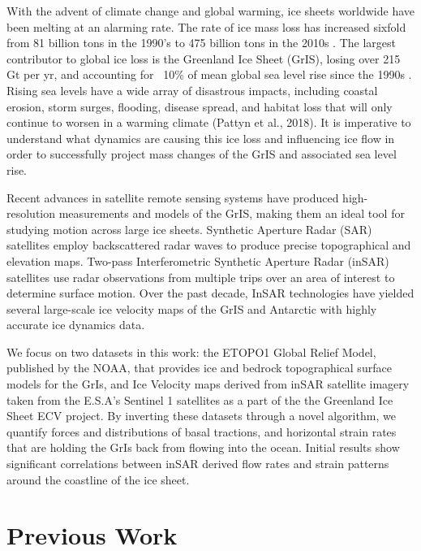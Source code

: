 \documentclass{article}
\begin{document}
With the advent of climate change and global warming, ice sheets worldwide have been melting at an alarming rate. The rate of ice mass loss has increased sixfold from 81 billion tons in the 1990’s to 475 billion tons in the 2010s \cite{stocker_climate_2013}. The largest contributor to global ice loss is the Greenland Ice Sheet (GrIS), losing over 215 Gt per yr, and accounting for ~10\% of mean global sea level rise since the 1990s \cite{stocker_climate_2013}. Rising sea levels have a wide array of disastrous impacts, including coastal erosion, storm surges, flooding, disease spread, and habitat loss that will only continue to worsen in a warming climate (Pattyn et al., 2018). It is imperative to understand what dynamics are causing this ice loss and influencing ice flow in order to successfully project mass changes of the GrIS and associated sea level rise.

Recent advances in satellite remote sensing systems have produced high-resolution measurements and models of the GrIS, making them an ideal tool for studying motion across large ice sheets. Synthetic Aperture Radar (SAR) satellites employ backscattered radar waves to produce precise topographical and elevation maps. Two-pass Interferometric Synthetic Aperture Radar (inSAR) satellites use radar observations from multiple trips over an area of interest to determine surface motion. Over the past decade, InSAR technologies have yielded several large-scale ice velocity maps of the GrIS and Antarctic with highly accurate ice dynamics data. 

We focus on two datasets in this work: the ETOPO1 Global Relief Model, published by the NOAA, that provides ice and bedrock topographical surface models for the GrIs, and Ice Velocity maps derived from inSAR satellite imagery taken from the E.S.A's Sentinel 1 satellites as a part of the the Greenland Ice Sheet ECV project. By inverting these datasets through a novel algorithm, we quantify forces and distributions of basal tractions, and horizontal strain rates that are holding the GrIs back from flowing into the ocean. Initial results show significant correlations between inSAR derived flow rates and strain patterns around the coastline of the ice sheet.

\section{Previous Work}
\end{document}
